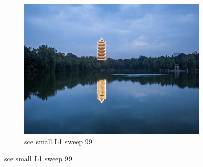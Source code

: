 \documentclass[11pt]{article}
\begin{document}
\begin{figure}[ht!]
\begin{subfigure}[]{0.333\linewidth}
        \centering
        \includegraphics[width=\linewidth]{fig/restoration/sce_small/L1/gibbs_99.jpg}
        \caption{sce small L1 sweep 99}
    \end{subfigure}%
\end{figure}
\end{document}
